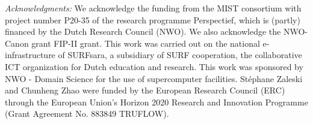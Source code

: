 \documentclass[reprint,amssymb,superscriptaddress,aps,prl,floatfix]{revtex4-2}
\begin{document}
\begin{acknowledgments} 
  {\it Acknowledgments:} We acknowledge the funding from the MIST consortium with project
  number P20-35 of the research programme Perspectief, which is (partly) financed by the
  Dutch Research Council (NWO). We also acknowledge the NWO-Canon grant FIP-II grant. This
  work was carried out on the national e-infrastructure of SURFsara, a subsidiary of SURF
  cooperation, the collaborative ICT organization for Dutch education and research. This
  work was sponsored by NWO - Domain Science for the use of supercomputer facilities. St\'ephane Zaleski and Chunheng Zhao were funded by the European Research Council (ERC) through the European Union's Horizon 2020 Research and Innovation Programme (Grant Agreement No. 883849 TRUFLOW).
\end{acknowledgments}



\end{document}
